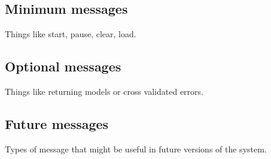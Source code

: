 \documentclass[twoside,11pt]{article}
\begin{document}
\subsection{Minimum messages}

Things like start, pause, clear, load.

\subsection{Optional messages}

Things like returning models or cross validated errors.

\subsection{Future messages}

Types of message that might be useful in future versions of the system. 

\newpage


\vskip 0.2in

\end{document}

